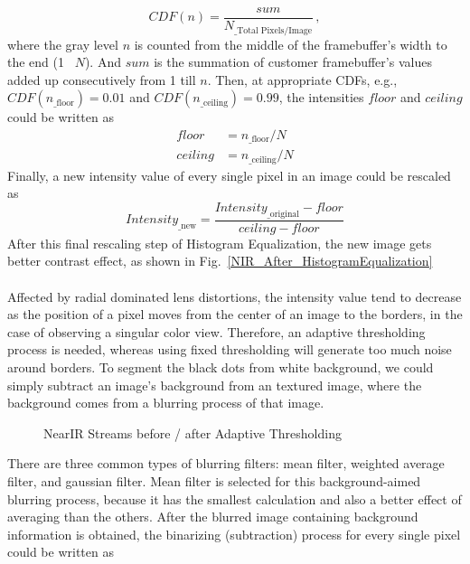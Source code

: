 %
\begin{equation}
%
CDF(n) = \frac{sum}{N_{\text{\_Total Pixels/Image}}} \, ,
%
\end{equation}%
%
where the gray level \(n\) is counted from the middle of the framebuffer's width to the end (1 \texttildelow \, \(N\)). And \(sum\) is the summation of customer framebuffer's values added up consecutively from 1 till \(n\). %
%
Then, at appropriate CDFs, e.g., \(CDF(n_{\text{\_floor}}) = 0.01\) and \(CDF(n_{\text{\_ceiling}}) = 0.99\), the intensities \(floor\) and \(ceiling\) could be written as
%
\begin{equation}
\begin{aligned}
floor &=  n_{\text{\_floor}} / N%
\\%
ceiling &=  n_{\text{\_ceiling}} / N
\end{aligned}
\label{intensityFloorCeilingDetermination}
\end{equation}%
%
\noindent
Finally, a new intensity value of every single pixel in an image could be rescaled as
%
\begin{equation}
Intensity_{\text{\_new}} = \frac{Intensity_{\text{\_original}} - floor}{ceiling - floor} 
\end{equation}%
%
\noindent
After this final rescaling step of Histogram Equalization, the new image gets better contrast effect, as shown in Fig.~\ref{NIR_After_HistogramEqualization}%
\\\\\indent%
Affected by radial dominated lens distortions, the intensity value tend to decrease as the position of a pixel moves from the center of an image to the borders, in the case of observing a singular color view. Therefore, an adaptive thresholding process is needed, whereas using fixed thresholding will generate too much noise around borders. To segment the black dots from white background, we could simply subtract an image's background from an textured image, where the background comes from a blurring process of that image.%
%
 \begin{figure}[t]
\hspace*{-0.5cm}
\centering
{}
\caption{NearIR Streams before / after Adaptive Thresholding}
\label{Adaptive_Thresholding}
\end{figure}%
%
There are three common types of blurring filters: mean filter, weighted average filter, and gaussian filter. Mean filter is selected for this background-aimed blurring process, because it has the smallest calculation and also a better effect of averaging than the others. After the blurred image containing background information is obtained, the binarizing (subtraction) process for every single pixel could be written as

